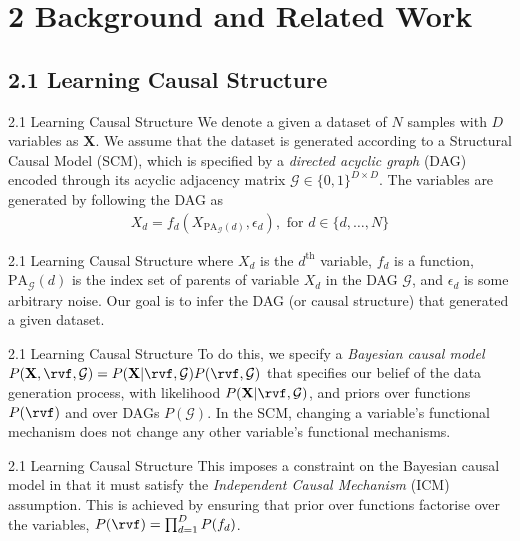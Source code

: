 \documentclass[aspectratio=169,10pt]{beamer}
\begin{document}
\section{2 Background and Related Work}
\subsection{2.1 Learning Causal Structure}

\begin{frame}{2.1 Learning Causal Structure}
We denote a given a dataset of $N$ samples with $D$ variables as $\mathbf{X}$. We assume that the dataset is generated according to a Structural Causal Model (SCM), which is specified by a \textit{directed acyclic graph} (DAG) encoded through its acyclic adjacency matrix $\mathcal{G} \in \{0,1\}^{D \times D}$. The variables are generated by following the DAG as
\begin{align*}
    X_d = f_d(X_{\text{PA}_{\mathcal{G}}(d)}, \epsilon_d), \text{ \ for \ } d \in \{d, \ldots,N\}
\end{align*}
\end{frame}

\begin{frame}{2.1 Learning Causal Structure}
where $X_d$ is the $d^{\text{th}}$ variable, $f_d$ is a function, $\text{PA}_{\mathcal{G}}(d)$ is the index set of parents of variable $X_d$ in the DAG $\mathcal{G}$, and $\epsilon_d$ is some arbitrary noise. Our goal is to infer the DAG (or causal structure) that generated a given dataset.
\end{frame}

\begin{frame}{2.1 Learning Causal Structure}
To do this, we specify a \textit{Bayesian causal model} $P(\mathbf{X}, \rvf, \mathcal{G}) = P(\mathbf{X} |\rvf, \mathcal{G})P(\rvf, \mathcal{G})$ that specifies our belief of the data generation process, with likelihood $P(\mathbf{X} |\rvf, \mathcal{G})$, and priors over functions $P(\rvf)$ and over DAGs $P(\mathcal{G})$. In the SCM, changing a variable's functional mechanism does not change any other variable's functional mechanisms.
\end{frame}

\begin{frame}{2.1 Learning Causal Structure}
This imposes a constraint on the Bayesian causal model in that it must satisfy the \textit{Independent Causal Mechanism} (ICM) assumption. This is achieved by ensuring that prior over functions factorise over the variables, $P(\rvf) = \prod_{d=1}^D P(f_d)$.
\end{frame}
\end{document}
